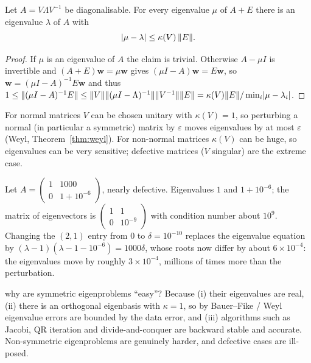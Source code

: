 \begin{theorem}\label{thm:bauerfike}
Let $A=V\Lambda V^{-1}$ be diagonalisable. For every eigenvalue $\mu$ of $A+E$ there is an eigenvalue $\lambda$ of $A$ with
\[ \lvert\mu-\lambda\rvert\le\kappa(V)\,\lVert E\rVert. \]
\end{theorem}

\begin{proof}
If $\mu$ is an eigenvalue of $A$ the claim is trivial. Otherwise $A-\mu I$ is invertible and $(A+E)\mathbf{w}=\mu\mathbf{w}$ gives $(\mu I-A)\mathbf{w}=E\mathbf{w}$, so $\mathbf{w}=(\mu I-A)^{-1}E\mathbf{w}$ and thus $1\le\lVert(\mu I-A)^{-1}E\rVert\le\lVert V\rVert\lVert(\mu I-\Lambda)^{-1}\rVert\lVert V^{-1}\rVert\lVert E\rVert=\kappa(V)\lVert E\rVert/\min_i\lvert\mu-\lambda_i\rvert$.
\end{proof}

For normal matrices $V$ can be chosen unitary with $\kappa(V)=1$, so perturbing a normal (in particular a symmetric) matrix by $\varepsilon$ moves eigenvalues by at most $\varepsilon$ (Weyl, Theorem~\ref{thm:weyl}). For non-normal matrices $\kappa(V)$ can be huge, so eigenvalues can be very sensitive; defective matrices ($V$ singular) are the extreme case.

\begin{example}
Let $A=\begin{pmatrix}1&1000\\0&1+10^{-6}\end{pmatrix}$, nearly defective. Eigenvalues $1$ and $1+10^{-6}$; the matrix of eigenvectors is $\begin{pmatrix}1&1\\0&10^{-9}\end{pmatrix}$ with condition number about $10^9$. Changing the $(2,1)$ entry from $0$ to $\delta=10^{-10}$ replaces the eigenvalue equation by $(\lambda-1)(\lambda-1-10^{-6})=1000\delta$, whose roots now differ by about $6\times10^{-4}$: the eigenvalues move by roughly $3\times10^{-4}$, millions of times more than the perturbation.
\end{example}

\begin{interview}{why are symmetric eigenproblems ``easy''?}
Because (i) their eigenvalues are real, (ii) there is an orthogonal eigenbasis with $\kappa=1$, so by Bauer--Fike / Weyl eigenvalue errors are bounded by the data error, and (iii) algorithms such as Jacobi, QR iteration and divide-and-conquer are backward stable and accurate. Non-symmetric eigenproblems are genuinely harder, and defective cases are ill-posed.
\end{interview}

